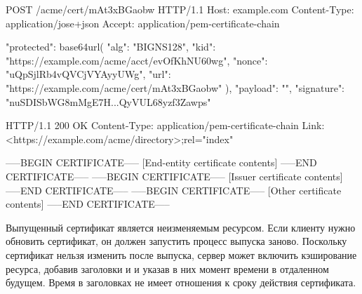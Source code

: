 \begin{codeblock}
POST /acme/cert/mAt3xBGaobw HTTP/1.1
Host: example.com
Content-Type: application/jose+json
Accept: application/pem-certificate-chain

{
  "protected": base64url({
    "alg": "BIGNS128",
    "kid": "https://example.com/acme/acct/evOfKhNU60wg",
    "nonce": "uQpSjlRb4vQVCjVYAyyUWg",
    "url": "https://example.com/acme/cert/mAt3xBGaobw"
  }),
  "payload": "",
  "signature": "nuSDISbWG8mMgE7H...QyVUL68yzf3Zawps"
}

HTTP/1.1 200 OK
Content-Type: application/pem-certificate-chain
Link: <https://example.com/acme/directory>;rel="index"

-----BEGIN CERTIFICATE-----
[End-entity certificate contents]
-----END CERTIFICATE-----
-----BEGIN CERTIFICATE-----
[Issuer certificate contents]
-----END CERTIFICATE-----
-----BEGIN CERTIFICATE-----
[Other certificate contents]
-----END CERTIFICATE-----
\end{codeblock}
\fi

Выпущенный сертификат является неизменяемым ресурсом. Если клиенту
нужно обновить сертификат, он должен запустить процесс выпуска заново.
%
Поскольку сертификат нельзя изменить после выпуска, сервер 
может включить кэширование ресурса, добавив заголовки  и 
 и указав в них момент времени в отдаленном будущем. 
Время в заголовках не имеет отношения к сроку действия сертификата. 



